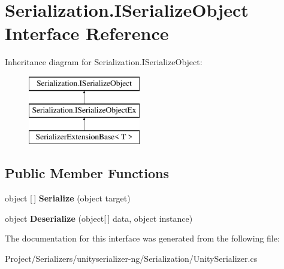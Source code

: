 \hypertarget{interface_serialization_1_1_i_serialize_object}{}\section{Serialization.\+I\+Serialize\+Object Interface Reference}
\label{interface_serialization_1_1_i_serialize_object}
Inheritance diagram for Serialization.\+I\+Serialize\+Object\+:\begin{figure}[H]
\begin{center}
\leavevmode
\includegraphics[height=3.000000cm]{interface_serialization_1_1_i_serialize_object}
\end{center}
\end{figure}
\subsection*{Public Member Functions}
\begin{DoxyCompactItemize}
\item 
\mbox{\label{interface_serialization_1_1_i_serialize_object_a4e84ab8859d2e9921ee7d4d0eda0da97}} 
object \mbox{[}$\,$\mbox{]} {\bfseries Serialize} (object target)
\item 
\mbox{\label{interface_serialization_1_1_i_serialize_object_a100975fc581fdc4e4d29759daef4b99e}} 
object {\bfseries Deserialize} (object\mbox{[}$\,$\mbox{]} data, object instance)
\end{DoxyCompactItemize}


The documentation for this interface was generated from the following file\+:\begin{DoxyCompactItemize}
\item 
Project/\+Serializers/unityserializer-\/ng/\+Serialization/Unity\+Serializer.\+cs\end{DoxyCompactItemize}
